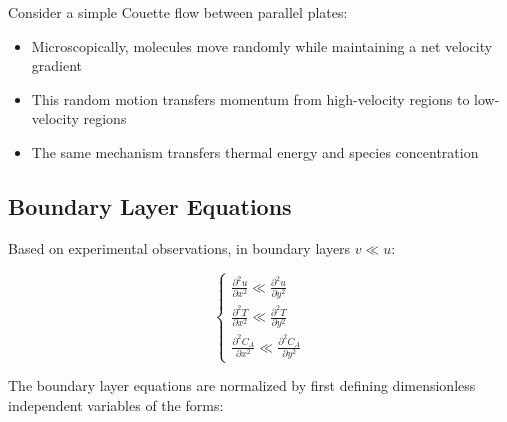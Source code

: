 Consider a simple Couette flow between parallel plates:
\begin{itemize}
    \item Microscopically, molecules move randomly while maintaining a net velocity gradient
    \item This random motion transfers momentum from high-velocity regions to low-velocity regions
    \item The same mechanism transfers thermal energy and species concentration
\end{itemize}

\subsection*{Boundary Layer Equations}

Based on experimental observations, in boundary layers $v \ll u$:
%

\begin{minipage}{0.3\textwidth}%
\begin{figure}[H]
    \centering
    
\end{figure}
\end{minipage}%
\hfill%
\begin{minipage}{0.6\textwidth}\raggedleft
\[
    \left\{\begin{array}{l}
    \frac{\partial^2 u}{\partial x^2} \ll \frac{\partial^2 u}{\partial y^2} 
    \\[1em]
    \frac{\partial^2 T}{\partial x^2} \ll \frac{\partial^2 T}{\partial y^2} 
    \\[1em]
    \frac{\partial^2 C_A}{\partial x^2} \ll \frac{\partial^2 C_A}{\partial y^2}
    \end{array}\right.
\]
\end{minipage}
%
The boundary layer equations are normalized by first defining dimensionless independent
variables of the forms:

